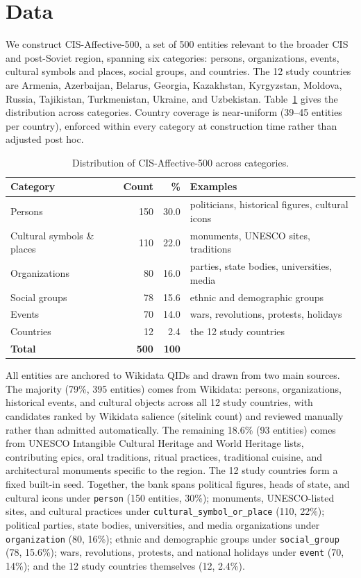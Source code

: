 \documentclass[runningheads,a4paper]{llncs}
\begin{document}
\section{Data}
\label{sec:targetbank}

We construct CIS-Affective-500, a set of 500 entities relevant to the broader CIS and post-Soviet region, spanning six categories: persons, organizations, events, cultural symbols and places, social groups, and countries. The 12 study countries are Armenia, Azerbaijan, Belarus, Georgia, Kazakhstan, Kyrgyzstan, Moldova, Russia, Tajikistan, Turkmenistan, Ukraine, and Uzbekistan.
Table~\ref{tab:categories} gives the distribution across categories.
Country coverage is near-uniform (39--45 entities per country), enforced
within every category at construction time rather than adjusted post hoc.

\begin{table}[!htbp]
\caption{Distribution of CIS-Affective-500 across categories.}
\label{tab:categories}
\centering
\begin{tabular}{|l|r|r|p{4.5cm}|}
\hline
Category & Count & \% & Examples \\
\hline
Persons           & 150 & 30.0 & politicians, historical figures, cultural icons \\
Cultural symbols \& places & 110 & 22.0 & monuments, UNESCO sites, traditions \\
Organizations     & 80  & 16.0 & parties, state bodies, universities, media \\
Social groups     & 78  & 15.6 & ethnic and demographic groups \\
Events            & 70  & 14.0 & wars, revolutions, protests, holidays \\
Countries         & 12  &  2.4 & the 12 study countries \\
\hline
\textbf{Total}    & \textbf{500} & \textbf{100} & \\
\hline
\end{tabular}
\end{table}

All entities are anchored to Wikidata QIDs and drawn from two main
sources. The majority (79\%, 395 entities) comes from Wikidata: persons,
organizations, historical events, and cultural objects across all 12 study
countries, with candidates ranked by Wikidata salience (sitelink count)
and reviewed manually rather than admitted automatically. The remaining 18.6\%
(93 entities) comes from UNESCO Intangible Cultural Heritage and World
Heritage lists, contributing epics, oral traditions, ritual practices,
traditional cuisine, and architectural monuments specific to the region.
The 12 study countries form a fixed built-in seed. Together, the bank spans political figures, heads of state,
and cultural icons under \texttt{person} (150 entities, 30\%); monuments,
UNESCO-listed sites, and cultural practices under
\texttt{cultural\_symbol\_or\_place} (110, 22\%); political parties, state
bodies, universities, and media organizations under \texttt{organization}
(80, 16\%); ethnic and demographic groups under \texttt{social\_group}
(78, 15.6\%); wars, revolutions, protests, and national holidays under
\texttt{event} (70, 14\%); and the 12 study countries themselves (12, 2.4\%).
\end{document}

